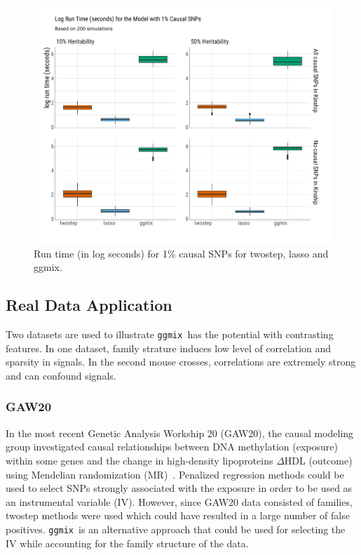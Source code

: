 \documentclass[12pt,letter]{article}\usepackage[]{graphicx}\usepackage[]{color}
\newenvironment{knitrout}{}{} %
\newcommand{\ggmix}{\texttt{ggmix}}
\begin{document}
\begin{knitrout}\scriptsize
{}\color{fgcolor}\begin{figure}[H]

{\centering \includegraphics[width=1\linewidth]{figure/plot-runtime-sim-1p-causal-1} 

}

\caption[Run time (in log seconds) for 1\% causal SNPs for twostep, lasso and ggmix]{Run time (in log seconds) for 1\% causal SNPs for twostep, lasso and ggmix.}\label{fig:plot-runtime-sim-1p-causal}
\end{figure}


\end{knitrout}




\subsection{Real Data Application}

Two datasets are used to illustrate \ggmix ~has the potential with contrasting features. In one dataset, family strature induces low level of correlation and sparsity in signals. In the second mouse crosses, correlations are extremely strong and can confound signals.

\subsubsection{GAW20}

In the most recent Genetic Analysis Workship 20 (GAW20),  the causal modeling group investigated causal relationships between DNA methylation (exposure) within some genes and the change in high-density lipoproteins $\Delta$HDL (outcome) using Mendelian randomization (MR)~\citep{davey2003mendelian}.
Penalized regression methods could be used to select SNPs strongly associated with the exposure in order to be used as an instrumental variable (IV).
However, since GAW20 data consisted of families, twostep methods were used which could have resulted in a large number of false positives. \ggmix~is an alternative approach that could be used for selecting the IV while accounting for the family structure of the data.
\end{document}
